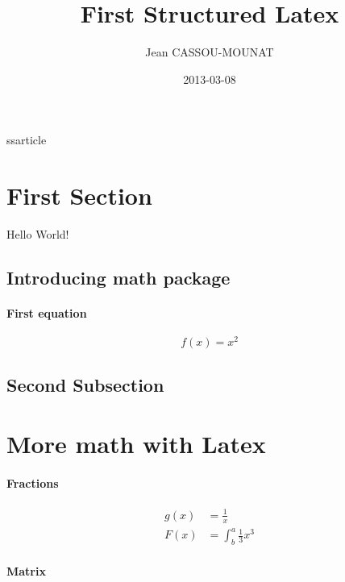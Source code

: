 ss{article}
\usepackage{amsmath}
\usepackage{graphicx}
\usepackage[nottoc]{tocbibind}

\title{First Structured Latex}
\date{2013-03-08}
\author{Jean CASSOU-MOUNAT}



\maketitle
{}
\newpage
{}

\tableofcontents

\section{First Section}

Hello World!

\subsection{Introducing math package}

\paragraph{First equation}

\begin{equation*}
  f(x) = x^2
\end{equation*}

\subsection{Second Subsection}

\section{More math with Latex}

\paragraph{Fractions}

\begin{align*}
  g(x) &= \frac{1}{x}\\
  F(x) &= \int^a_b \frac{1}{3}x^3
\end{align*}

\paragraph{Matrix}

